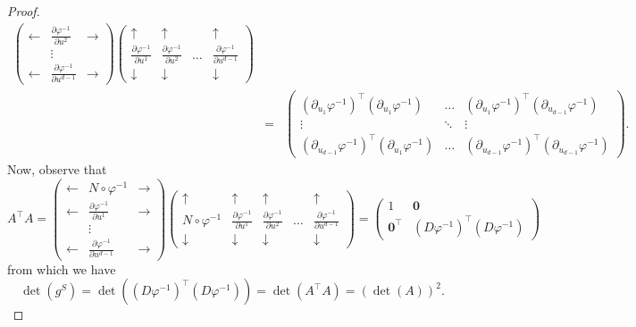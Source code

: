 \documentclass{article}
\renewcommand\det{\operatorname{det}}
\newcommand{\p}{\partial}
\newcommand{\f}[2]{\frac{#1}{#2}}
\theoremstyle{theorem}
\begin{document}
\begin{proof}
\begin{eqnarray*}
\begin{pmatrix}
     \leftarrow & \f{\p \varphi^{-1}}{\p u^2} & \rightarrow \\
     &\vdots& \\
     \leftarrow & \f{\p \varphi^{-1}}{\p u^{d-1}} & \rightarrow 
    \end{pmatrix} \begin{pmatrix}
    \uparrow & \uparrow &   &\uparrow \\ 
    \f{\p \varphi^{-1}}{\p u^1}& \f{\p \varphi^{-1}}{\p u^2}  &\dots&\f{\p \varphi^{-1}}{\p u^{d-1}}\\
    \downarrow  & \downarrow &    &\downarrow 
    \end{pmatrix} \\
    &=& \begin{pmatrix} 
    (\p_{u_1} \varphi^{-1})^\top (\p_{u_1} \varphi^{-1}) & \dots & (\p_{u_1}  \varphi^{-1})^\top (\p_{u_{d-1}}\varphi^{-1}) \\
    \vdots & \ddots & \vdots \\
    (\p_{u_{d-1}} \varphi^{-1})^\top (\p_{u_1} \varphi^{-1}) & \dots & (\p_{u_{d-1}} \varphi^{-1})^\top (\p_{u_{d-1}}\varphi^{-1})
    \end{pmatrix}.
\end{eqnarray*}
Now, observe that
\begin{equation*}
    A^\top A = \begin{pmatrix}
    \leftarrow& N \circ \varphi^{-1} & \rightarrow\\
    \leftarrow & \f{\p \varphi^{-1}}{\p u^1} &\rightarrow \\
    &\vdots& \\
    \leftarrow & \f{\p \varphi^{-1}}{\p u^{d-1}} & \rightarrow
    \end{pmatrix}
    \begin{pmatrix}
    \uparrow &\uparrow & \uparrow &   &\uparrow \\ 
    N \circ \varphi^{-1} &\f{\p \varphi^{-1}}{\p u^1}& \f{\p \varphi^{-1}}{\p u^2}  &\dots&\f{\p \varphi^{-1}}{\p u^{d-1}}\\
    \downarrow  &\downarrow  & \downarrow &    &\downarrow
    \end{pmatrix} = 
    \begin{pmatrix}
    1 & \mathbf{0} \\ \mathbf{0}^\top & (D\varphi^{-1})^\top (D\varphi^{-1})
    \end{pmatrix}
\end{equation*}
from which we have
\begin{equation*}
    \det(g^S) = \det((D\varphi^{-1})^\top (D\varphi^{-1})) = \det(A^\top A) = (\det(A))^2.

\end{equation*}
\end{proof}
\end{document}
